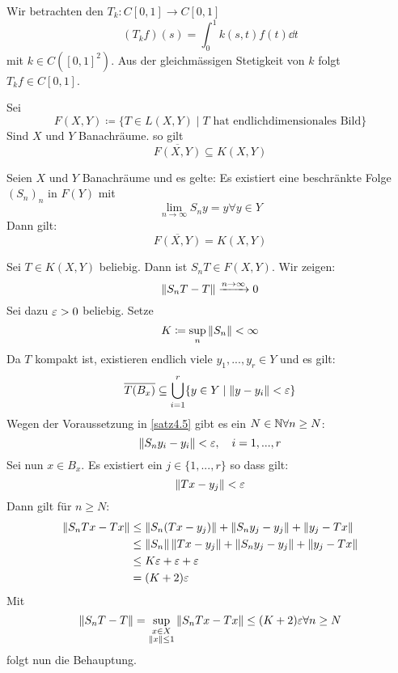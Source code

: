 \begin{beispiel*}
	Wir betrachten den  $ T_k\colon C[0,1]\rightarrow C[0,1] $
	\[ (T_kf)(s)=\int_0^1 k(s,t)f(t)\dd t \]
	mit $ k\in C([0,1]^2) $. Aus der gleichm\"assigen Stetigkeit von $ k $ folgt $ T_kf\in C[0,1] $. 
\end{beispiel*}
%
%
%
%
%
%
%
%
%
%
\begin{bemerkung*}
	Sei
	\[ F(X,Y)\coloneqq\lbrace T\in L(X,Y)\mid T\text{ hat endlichdimensionales Bild}\rbrace \]
	Sind $ X $ und $ Y $ Banachr\"aume. so gilt
	\[ \overline{F(X,Y)}\subseteq K(X,Y) \]
\end{bemerkung*}
\begin{satz}
	Seien $ X $ und $ Y $ Banachr\"aume und es gelte: Es existiert eine beschr\"ankte Folge $ (S_n)_n $ in $ F(Y) $ mit
	\[ \lim_{n\to\infty}S_ny=y\forall y\in Y \]
	Dann gilt:
	\[ \overline{F(X,Y)}=K(X,Y) \]
\end{satz}
\begin{beweis}
	Sei $ T\in K(X,Y) $ beliebig. Dann ist $ S_nT\in F(X,Y) $. Wir zeigen:
	\[ \left\|S_nT-T\right\|\xrightarrow{n\to\infty}0 \]
	Sei dazu $ \varepsilon>0 $ beliebig. Setze
	\[ K\coloneqq\sup_n\left\|S_n\right\|<\infty \]
	Da $ T $ kompakt ist, existieren endlich viele $ y_1,...,y_r\in Y $ und es gilt:
	\[ \overline{T(B_x)}\subseteq\bigcup_{i=1}^r\lbrace y\in Y\mid\left\|y-y_i\right\|<\varepsilon\rbrace \]
	Wegen der Voraussetzung in \ref{satz4.5} gibt es ein $ N\in\mathbb{N}\forall n\geq N $:
	\[ \left\|S_ny_i-y_i\right\|<\varepsilon,\quad i=1,...,r \]
	Sei nun $ x\in B_x $. Es existiert ein $ j\in\lbrace 1,...,r\rbrace $ so dass gilt:
	\[ \left\|Tx-y_j\right\|<\varepsilon \]
	Dann gilt f\"ur $ n\geq N $:
	\begin{align*} \left\|S_nTx-Tx\right\|&\leq\left\|S_n(Tx-y_j)\right\|+\left\|S_ny_j-y_j\right\|+\left\|y_j-Tx\right\|\\&\leq\left\|S_n\right\|\left\|Tx-y_j\right\|+\left\|S_ny_j-y_j\right\|+\left\|y_j-Tx\right\|\\&\leq K\varepsilon+\varepsilon+\varepsilon\\&=(K+2)\varepsilon \end{align*}
	Mit
	\[ \left\|S_nT-T\right\|=\sup_{\substack{x\in X\\\left\|x\right\|\leq 1}}\left\|S_nTx-Tx\right\|\leq (K+2)\varepsilon\forall n\geq N \]
	folgt nun die Behauptung.
\end{beweis}
